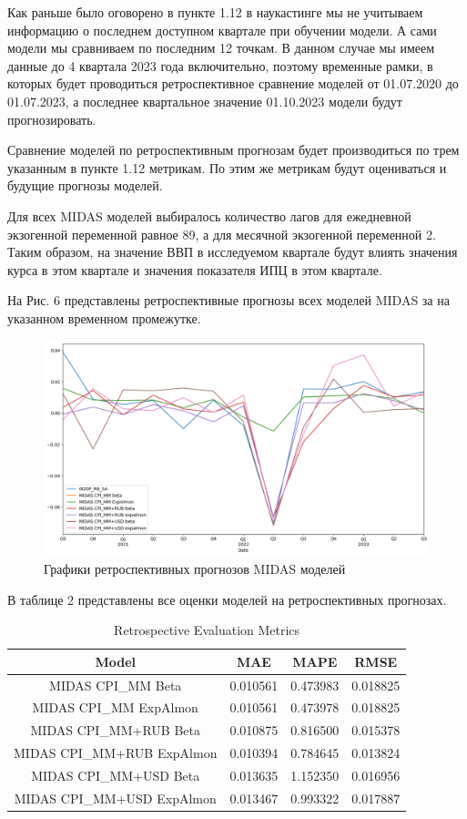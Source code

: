 \documentclass[a4paper, 12pt]{extarticle}
\numberwithin{equation}{subsection}
\begin{document}
	Как раньше было оговорено в пункте 1.12 в наукастинге мы не учитываем информацию о последнем доступном квартале при обучении модели. А сами модели мы сравниваем по последним 12 точкам. В данном случае мы имеем данные до 4 квартала 2023 года включительно, поэтому временные рамки, в которых будет проводиться ретроспективное сравнение моделей от 01.07.2020 до 01.07.2023, а последнее квартальное значение 01.10.2023 модели будут прогнозировать. 
	
	Сравнение моделей по ретроспективным прогнозам будет производиться по трем указанным в пункте 1.12 метрикам. По этим же метрикам будут оцениваться и будущие прогнозы моделей.
	
	Для всех MIDAS моделей выбиралось количество лагов для ежедневной экзогенной переменной равное 89, а для месячной экзогенной переменной 2. Таким образом, на значение ВВП в исследуемом квартале будут влиять значения курса в этом квартале и значения показателя ИПЦ в этом квартале.
	
	На Рис. 6 представлены ретроспективные прогнозы всех моделей MIDAS за на указанном временном промежутке.
	\begin{figure}[h]
		\centering
		\includegraphics[scale=0.5]{images/img06}
		\caption{Графики ретроспективных прогнозов MIDAS моделей}
		\label{fig:img06}
	\end{figure}
	
	В таблице 2 представлены все оценки моделей на ретроспективных прогнозах.
\begin{table}[h]
	\centering
	\caption{Retrospective Evaluation Metrics}
	\label{tab:evaluation_metrics}
	\begin{tabular}{|c|c|c|c|}
		\hline
		Model & MAE & MAPE & RMSE \\
		\hline
		MIDAS CPI\_MM Beta          & 0.010561 & 0.473983 & 0.018825 \\
		MIDAS CPI\_MM ExpAlmon      & 0.010561 & 0.473978 & 0.018825 \\
		MIDAS CPI\_MM+RUB Beta      & 0.010875 & 0.816500 & 0.015378 \\
		MIDAS CPI\_MM+RUB ExpAlmon  & 0.010394 & 0.784645 & 0.013824 \\
		MIDAS CPI\_MM+USD Beta      & 0.013635 & 1.152350 & 0.016956 \\
		MIDAS CPI\_MM+USD ExpAlmon  & 0.013467 & 0.993322 & 0.017887 \\
		\hline
	\end{tabular}
\end{table}
\end{document}
